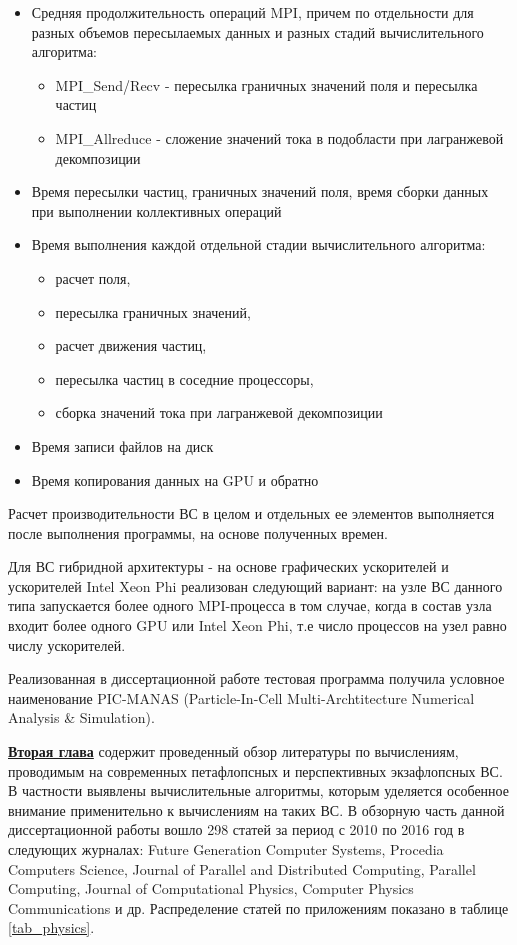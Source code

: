 \begin{itemize}
	\item Средняя продолжительность операций MPI, причем по отдельности для разных объемов пересылаемых данных и разных стадий вычислительного алгоритма:
\begin{itemize}
	\item MPI\_Send/Recv - пересылка граничных значений поля и пересылка частиц
	\item MPI\_Allreduce - сложение значений тока в подобласти при лагранжевой декомпозиции
	
\end{itemize}	
	\item Время пересылки частиц, граничных значений поля, время сборки данных при выполнении коллективных операций   
	\item Время выполнения каждой отдельной стадии вычислительного алгоритма:
\begin{itemize}
	\item расчет поля, 
	\item пересылка граничных значений, 
	\item расчет движения частиц, 
	\item пересылка частиц в соседние процессоры, 
	\item сборка значений тока при лагранжевой декомпозиции
\end{itemize}
	\item Время записи файлов на диск 
	\item Время копирования данных на GPU и обратно
	
\end{itemize}
Расчет производительности ВС в целом и отдельных ее элементов выполняется после выполнения программы, на основе полученных времен. 

Для ВС гибридной архитектуры - на основе графических ускорителей и ускорителей Intel Xeon Phi реализован следующий вариант: на узле ВС данного типа запускается более одного MPI-процесса в том случае, когда в состав узла входит более одного GPU или Intel Xeon Phi, т.е число процессов на узел равно числу ускорителей.

Реализованная в диссертационной работе тестовая программа получила условное наименование 
PIC-MANAS (Particle-In-Cell Multi-Archtitecture Numerical Analysis & Simulation).



\underline{\textbf{Вторая глава}} содержит проведенный обзор литературы по вычислениям, проводимым на современных петафлопсных и перспективных экзафлопсных ВС. В частности выявлены вычислительные алгоритмы, которым уделяется особенное внимание применительно к вычислениям на таких ВС.
В обзорную часть данной диссертационной работы вошло 298 статей за период с 2010 по 2016 год в следующих журналах: Future Generation Computer Systems, Procedia Computers Science, Journal of Parallel and Distributed Computing, Parallel Computing, Journal of Computational Physics, Computer Physics Communications и др.  Распределение статей по приложениям показано в таблице \ref{tab_physics}.

